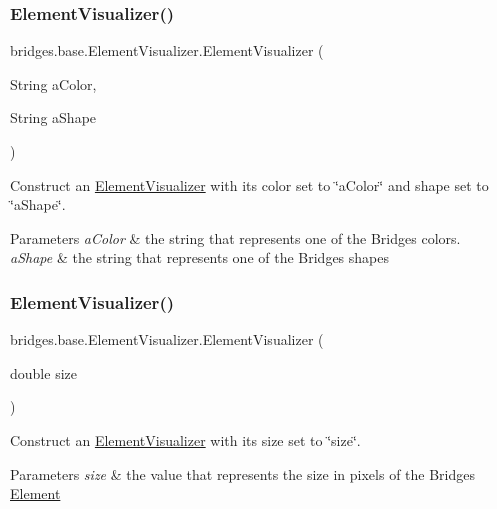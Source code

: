 \subsubsection{\texorpdfstring{Element\+Visualizer()}{ElementVisualizer()}\hspace{0.1cm}{\footnotesize\ttfamily [3/6]}}
{\footnotesize\ttfamily bridges.\+base.\+Element\+Visualizer.\+Element\+Visualizer (\begin{DoxyParamCaption}\item[{String}]{a\+Color,  }\item[{String}]{a\+Shape }\end{DoxyParamCaption})}

Construct an \mbox{\hyperlink{classbridges_1_1base_1_1_element_visualizer}{Element\+Visualizer}} with its color set to \char`\"{}a\+Color\char`\"{} and shape set to \char`\"{}a\+Shape\char`\"{}.


\begin{DoxyParams}{Parameters}
{\em a\+Color} & the string that represents one of the Bridges colors. \\
\hline
{\em a\+Shape} & the string that represents one of the Bridges shapes \\
\hline
\end{DoxyParams}
\mbox{\label{classbridges_1_1base_1_1_element_visualizer_ab32f66b72ccf0a26c03ba44006da9ac6}} 
\subsubsection{\texorpdfstring{Element\+Visualizer()}{ElementVisualizer()}\hspace{0.1cm}{\footnotesize\ttfamily [4/6]}}
{\footnotesize\ttfamily bridges.\+base.\+Element\+Visualizer.\+Element\+Visualizer (\begin{DoxyParamCaption}\item[{double}]{size }\end{DoxyParamCaption})}

Construct an \mbox{\hyperlink{classbridges_1_1base_1_1_element_visualizer}{Element\+Visualizer}} with its size set to \char`\"{}size\char`\"{}.


\begin{DoxyParams}{Parameters}
{\em size} & the value that represents the size in pixels of the Bridges \mbox{\hyperlink{classbridges_1_1base_1_1_element}{Element}} \\
\hline
\end{DoxyParams}
\mbox{\label{classbridges_1_1base_1_1_element_visualizer_a9bf06ca1b6c215e079ab33ccd99633e8}} 
